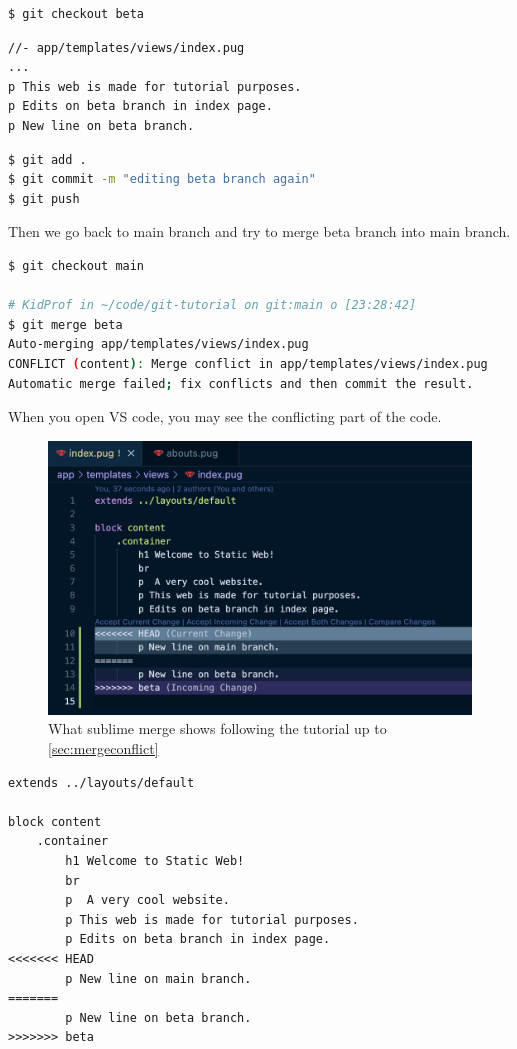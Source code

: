 \begin{lstlisting}[language=bash]
$ git checkout beta
\end{lstlisting}

\begin{lstlisting}[language=pug]
//- app/templates/views/index.pug
...
p This web is made for tutorial purposes.
p Edits on beta branch in index page.
p New line on beta branch.
\end{lstlisting}

\begin{lstlisting}[language=bash]
$ git add .
$ git commit -m "editing beta branch again"
$ git push
\end{lstlisting}
\vspace{6mm}

Then we go back to main branch and try to merge beta branch into main branch.

\begin{lstlisting}[language=bash]
$ git checkout main

# KidProf in ~/code/git-tutorial on git:main o [23:28:42]
$ git merge beta
Auto-merging app/templates/views/index.pug
CONFLICT (content): Merge conflict in app/templates/views/index.pug
Automatic merge failed; fix conflicts and then commit the result.
\end{lstlisting}

When you open VS code, you may see the conflicting part of the code.
\begin{figure}[h]
\centering
\includegraphics[width=12cm]{images/ch8-merge-conflict-vscode.png}
\caption{What sublime merge shows following the tutorial up to \cref{sec:mergeconflict}}
\end{figure}

\begin{lstlisting}[language=pug]
extends ../layouts/default

block content
	.container
		h1 Welcome to Static Web!
		br
		p  A very cool website.
		p This web is made for tutorial purposes.
		p Edits on beta branch in index page.
<<<<<<< HEAD
		p New line on main branch.
=======
		p New line on beta branch.
>>>>>>> beta
\end{lstlisting}


